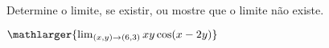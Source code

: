 Determine o limite, se existir, ou mostre que o limite não existe.

\item$\mathlarger{\lim_{(x,y)\rightarrow(6,3)} xy \cos(x-2y)}$
